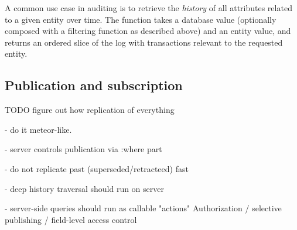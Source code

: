 A common use case in auditing is to retrieve the \emph{history} of all attributes related to a given entity over time. The  function takes a database value (optionally composed with a filtering function as described above) and an entity value, and returns an ordered slice of the log with transactions relevant to the requested entity.



\subsection{Publication and subscription}

TODO figure out how replication of everything

- do it meteor-like.

- server controls publication via :where part

- do not replicate past (superseded/retracteed) fast

- deep history traversal should run on server

- server-side queries should run as callable "actions"
Authorization / selective publishing / field-level access control
